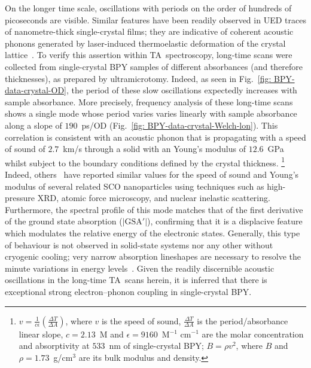 On the longer time scale, oscillations with periods on the order of hundreds of picoseconds
are visible. Similar features have been readily observed in UED traces of nanometre-thick
single-crystal films; they are indicative of coherent acoustic phonons generated by
laser-induced thermoelastic deformation of the crystal lattice~\cite{Harb2009, Gao2013, Jiang2017}.
%
To verify this assertion within TA~spectroscopy,
long-time scans were collected from single-crystal BPY samples
of different absorbances (and therefore thicknesses), as prepared by ultramicrotomy.
%
Indeed, as seen in Fig.~\ref{fig: BPY-data-crystal-OD}, the period of these slow oscillations
expectedly increases with sample absorbance.
%
More precisely, frequency analysis of these long-time scans shows a single mode
whose period varies varies linearly with sample absorbance
along a slope of $190$~ps/OD (Fig.~\ref{fig: BPY-data-crystal-Welch-lon}).
%
This correlation is consistent with an acoustic phonon that is propagating
with a speed of sound of $2.7$~km/s through a solid with
an Young's modulus of $12.6$~GPa whilst subject to the boundary conditions
defined by the crystal thickness.%
\footnote{$v = \frac{1}{c \epsilon}(\frac{\Delta T}{\Delta A})$,
where $v$ is the speed of sound, $\frac{\Delta T}{\Delta A}$ is the period/absorbance linear slope,
$c = 2.13$~M and $\epsilon = 9160$~{M$^{-1}$ cm$^{-1}$} are the molar concentration
and absorptivity at $533$~nm of single-crystal BPY;
$B = \rho v^2$, where $B$ and $\rho = 1.73$~g/cm$^3$ are its bulk modulus and density.}
Indeed, others~\cite{Shepherd2012, Hernandez2014, Felix2015} have reported similar values
for the speed of sound and Young's modulus of several related SCO nanoparticles using
techniques such as high-pressure XRD, atomic force microscopy, and nuclear inelastic scattering.
%
Furthermore, the spectral profile of this mode matches that of the first derivative
of the ground state absorption ($|\text{GSA}'|$),
confirming that it is a displacive feature which modulates the relative energy of the electronic states.
%
Generally, this type of behaviour is not observed in solid-state systems nor
any other without cryogenic cooling; very narrow absorption lineshapes are necessary
to resolve the minute variations in energy levels~\cite{Nelson1982, Miller1984}.
%
Given the readily discernible acoustic oscillations in the long-time TA~scans herein,
it is inferred that there is exceptional strong electron--phonon coupling in single-crystal BPY.

